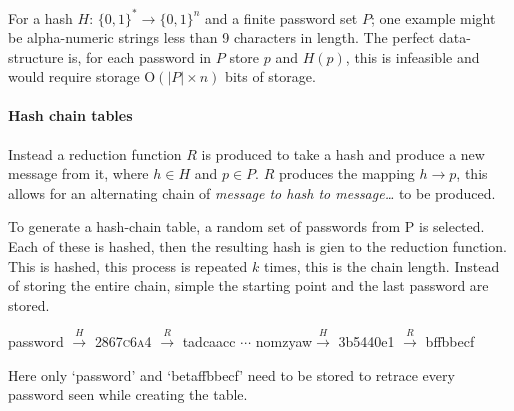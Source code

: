\documentclass[a4paper,12pt]{article}
\begin{document}
For a hash $H$: $\{0,1\}^* \rightarrow \{0,1\}^n$ and a finite password set $P$; one example might be alpha-numeric strings less than 9 characters in length. The perfect data-structure is, for each password in $P$ store $p$ and $H(p)$, this is infeasible and would require storage $\text{O}(|P| \times n)$ bits of storage.

\paragraph{Hash chain tables}
Instead a reduction function $R$ is produced to take a hash and produce a new message from it, where $h \in H$ and $p \in P$. $R$ produces the mapping $h \rightarrow p$, this allows for an alternating chain of \emph{message to hash to message\dots} to be produced.

To generate a hash-chain table\cite{Hellman1980}, a random set of passwords from P is selected. Each of these is hashed, then the resulting hash is gien to the reduction function. This is hashed, this process is repeated $k$ times, this is the chain length. Instead of storing the entire chain, simple the starting point and the last password are stored. 
\begin{center}
    password $\xrightarrow{H}$ \textsc{2867c6a4} $\xrightarrow{R}$ tadcaacc $\cdots$ nomzyaw$\xrightarrow{H}$ 3b5440e1 $\xrightarrow{R}$ bffbbecf
\end{center}
Here only `password' and `betaffbbecf' need to be stored to retrace every password seen while creating the table.
\end{document}
